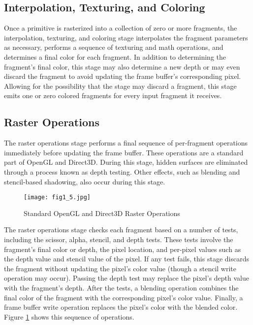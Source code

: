 \documentclass[../main.tex]{subfiles}
\begin{document}
\subsection*{Interpolation, Texturing, and Coloring}

Once a primitive is rasterized into a collection of zero or more fragments, the interpolation, texturing, and coloring stage interpolates the fragment parameters as necessary, performs a sequence of texturing and math operations, and determines a final color for each fragment. In addition to determining the fragment's final color, this stage may also determine a new depth or may even discard the fragment to avoid updating the frame buffer's corresponding pixel. Allowing for the possibility that the stage may discard a fragment, this stage emits one or zero colored fragments for every input fragment it receives.

\subsection*{Raster Operations}

The raster operations stage performs a final sequence of per-fragment operations immediately before updating the frame buffer. These operations are a standard part of OpenGL and Direct3D. During this stage, hidden surfaces are eliminated through a process known as depth testing. Other effects, such as blending and stencil-based shadowing, also occur during this stage.

\begin{figure}
    \centering
    \texttt{[image: fig1\_5.jpg]}
    \caption{Standard OpenGL and Direct3D Raster Operations}
    \label{fig:1-5}
\end{figure}

The raster operations stage checks each fragment based on a number of tests, including the scissor, alpha, stencil, and depth tests. These tests involve the fragment's final color or depth, the pixel location, and per-pixel values such as the depth value and stencil value of the pixel. If any test fails, this stage discards the fragment without updating the pixel's color value (though a stencil write operation may occur). Passing the depth test may replace the pixel's depth value with the fragment's depth. After the tests, a blending operation combines the final color of the fragment with the corresponding pixel's color value. Finally, a frame buffer write operation replaces the pixel's color with the blended color. Figure \ref{fig:1-5} shows this sequence of operations.
\end{document}
